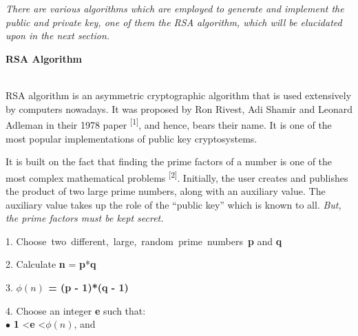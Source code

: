 \documentclass[12 pt]{article}
\begin{document}
\emph{\\\\There are various algorithms which are employed to generate and implement the public and private key, one of them the RSA algorithm, which will be elucidated upon in the next section.}

\pagebreak
\begin{LARGE}
\noindent \textbf{{RSA Algorithm}}
\end{LARGE}\\[12 pt]

\noindent RSA algorithm is an asymmetric cryptographic algorithm that is used extensively by computers nowadays. It was proposed by Ron Rivest, Adi Shamir and Leonard Adleman in their 1978 paper \textsuperscript{[1]}, and hence, bears their name. It is one of the most popular implementations of public key cryptosystems.\bigskip

\noindent It is built on the fact that finding the prime factors of a number is one of the most complex mathematical problems \textsuperscript{[2]}. Initially, the user creates and publishes the product of two large prime numbers, along with an auxiliary value. The auxiliary value takes up the role of the ``public key'' which is known to all. \emph{But, the prime factors must be kept secret.}\bigskip

1. Choose\ two\ different,\ large,\ random\  prime\  numbers\ \textbf{p} and \textbf{q}

2. Calculate \textbf{n} = \textbf{p}*\textbf{q}

3. \textbf{\boldmath $\phi(n)$ = (p - 1)*(q - 1)}

4. Choose an integer \textbf{e} such that:\\[3 pt]

\hspace{16.18 pt} $\bullet$ \textbf{1} \textless \textbf{e} \textless \boldmath $\phi(n)$, and
\end{document}
